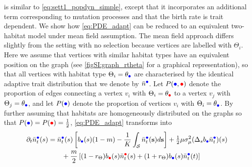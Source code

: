     is similar to \cref{eq:sett1_popdyn_simple}, except that it incorporates an additional term corresponding to mutation processes and that the birth rate is trait dependent.
  We show how \cref{eq:PDE_adapt} can be reduced to an equivalent two-habitat model under mean field assumption. %
  The mean field approach differs slightly from the setting with no selection because vertices are labelled with $\Theta_i$. Here we assume that vertices with similar habitat types have an equivalent position on the graph (see \cref{figSI:graph_rtheta} for a graphical representation), so that all vertices with habitat type $\Theta_i = \theta_{\bcirc}$ are characterised by the identical adaptive trait distribution that we denote by $\bar{n}^{{\bcirc}}$. Let $P({\bcirc},{\rcirc})$ denote the proportion of edges connecting a vertex $v_i$ with $\Theta_i = \theta_{\rcirc}$ to a vertex $v_j$ with $\Theta_j = \theta_{\bcirc}$, and let $P({\bcirc})$ denote the proportion of vertices $v_i$ with $\Theta_i = \theta_{\bcirc}$. 
  By further assuming that habitats are homogeneously distributed on the graphs so that $P({\bcirc}) = P({\rcirc}) = \tfrac{1}{2}$, \cref{eq:PDE_adapt} transforms into
  \begin{equation}\label{eq:PDE_adapt_rtheta}
	\begin{split}
	  \partial_t \bar{n}_t^{{\bcirc}}(s) &= \bar{n}_t^{{\bcirc}}(s)\left[ b_{{\bcirc}}(s) (1-m) - \frac{1}{K}\int_\mathcal{S}  \bar{n}_t^{{\bcirc}}({\textbf s}) d{\textbf s} \right] + \tfrac{1}{2} \mu \sigma_\mu^2 (\Delta_s b_{{\bcirc}} \bar{n}_t^{{\bcirc}})(s) \\
	  & \qquad + \frac{m}{2} \, [ (1-r_\Theta)  b_{{\rcirc}}(s) \bar{n}_t^{{\rcirc}}(s) + (1 + r_\Theta)  b_{{\bcirc}}(s) \bar{n}_t^{{\bcirc}}(t)]\\
	\end{split}
  \end{equation}
